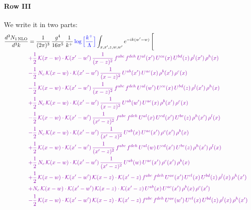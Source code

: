 \documentclass[10pt]{article}
\numberwithin{equation}{section}
\newcommand{\new}[1]{{\color{blue}#1}}
\begin{document}
\paragraph{Row III}
We write it in two parts: 
\begin{align}
\frac{d^{3}N_{1\,\mathrm{NLO}}}{d^{3}k} & = \frac{1}{(2\pi)^{3}}\,\frac{g^{4}}{16\pi^{5}}\,\frac{1}{k^{+}}\,\new{\log\Big[\frac{k^{+}}{\Lambda}\Big]}\int_{x,x',z,w,w'}e^{-ik(w'-w)}\,\Bigg[\notag\\ &{\color{CC}  +\frac{1}{2}\,\mathcal{K}(x-w)\cdot\mathcal{K}(x'-w')\,\frac{1}{(x-z)^{2}}\,f^{abc}\,f^{deh}\,U^{al}(x')\,U^{ce}(x)\,U^{bd}(z)\,\rho^{l}(x')\,\rho^{h}(x)} \notag\\
&{\color{CC} -\frac{1}{2}\,N_{c}\,\mathcal{K}(x-w)\cdot\mathcal{K}(x'-w')\,\frac{1}{(x-z)^{2}}\,U^{ab}(x')\,U^{ac}(x)\,\rho^{b}(x')\,\rho^{c}(x)} \notag\\
&{\color{CC} -\frac{1}{2}\,\mathcal{K}(x-w)\cdot\mathcal{K}(x'-w')\,\frac{1}{(x-z)^{2}}\,f^{abc}\,f^{deh}\,U^{al}(w')\,U^{ce}(x)\,U^{bd}(z)\,\rho^{l}(x')\,\rho^{h}(x)} \notag\\
&{\color{CC} +\frac{1}{2}\,N_{c}\,\mathcal{K}(x-w)\cdot\mathcal{K}(x'-w')\,\frac{1}{(x-z)^{2}}\,U^{ab}(w')\,U^{ac}(x)\,\rho^{b}(x')\,\rho^{c}(x)} \notag\\
&{\color{CC} -\frac{1}{2}\,\mathcal{K}(x-w)\cdot\mathcal{K}(x'-w')\,\frac{1}{(x'-z)^{2}}\,f^{abc}\,f^{deh}\,U^{al}(x)\,U^{cd}(x')\,U^{be}(z)\,\rho^{h}(x')\,\rho^{l}(x)} \notag\\
&{\color{CC} -\frac{1}{2}\,N_{c}\,\mathcal{K}(x-w)\cdot\mathcal{K}(x'-w')\,\frac{1}{(x'-z)^{2}}\,U^{ab}(x)\,U^{ac}(x')\,\rho^{c}(x')\,\rho^{b}(x)} \notag\\
&{\color{CC} +\frac{1}{2}\,\mathcal{K}(x-w)\cdot\mathcal{K}(x'-w')\,\frac{1}{(x'-z)^{2}}\,f^{abc}\,f^{deh}\,U^{al}(w)\,U^{cd}(x')\,U^{be}(z)\,\rho^{h}(x')\,\rho^{l}(x)} \notag\\
&{\color{CC} +\frac{1}{2}\,N_{c}\,\mathcal{K}(x-w)\cdot\mathcal{K}(x'-w')\,\frac{1}{(x'-z)^{2}}\,U^{ab}(w)\,U^{ac}(x')\,\rho^{c}(x')\,\rho^{b}(x)} \notag\\
&{\color{CC} +\frac{1}{2}\,\mathcal{K}(x-w)\cdot\mathcal{K}(x'-w')\,\mathcal{K}(x-z)\cdot\mathcal{K}(x'-z)\,f^{abc}\,f^{deh}\,U^{ae}(x')\,U^{cl}(x)\,U^{bd}(z)\,\rho^{l}(x)\,\rho^{h}(x')} \notag\\
&{\color{CC} +N_{c}\,\mathcal{K}(x-w)\cdot\mathcal{K}(x'-w')\,\mathcal{K}(x-z)\cdot\mathcal{K}(x'-z)\,U^{ab}(x)\,U^{ac}(x')\,\rho^{b}(x)\,\rho^{c}(x')} \notag\\
&{\color{CC} -\frac{1}{2}\,\mathcal{K}(x-w)\cdot\mathcal{K}(x'-w')\,\mathcal{K}(x-z)\cdot\mathcal{K}(x'-z)\,f^{abc}\,f^{deh}\,U^{ae}(w')\,U^{cl}(x)\,U^{bd}(z)\,\rho^{l}(x)\,\rho^{h}(x')} \notag\\

\end{align}
\end{document}
